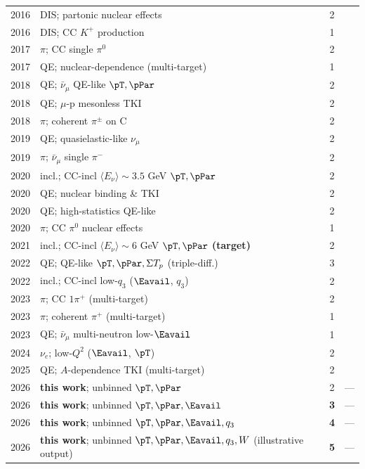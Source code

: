 {\begin{longtable}{@{}clcl@{}}
  2016 & DIS; partonic nuclear effects            & 2 & \cite{MINERvA:2016dis} \\
  2016 & DIS; CC $K^+$ production                  & 1 & \cite{MINERvA:2016kaon} \\
  2017 & $\pi$; CC single $\pi^0$                  & 2 & \cite{MINERvA:2017pi0} \\
  2017 & QE; nuclear-dependence (multi-target)     & 1 & \cite{MINERvA:2017Adep} \\
  2018 & QE; $\bar\nu_\mu$ QE-like $\pT,\pPar$     & 2 & \cite{MINERvA:2018hba} \\
  2018 & QE; $\mu$-p mesonless TKI                 & 2 & \cite{MINERvA:2018tcb} \\
  2018 & $\pi$; coherent $\pi^\pm$ on C            & 2 & \cite{MINERvA:2018coh} \\
  2019 & QE; quasielastic-like $\nu_\mu$           & 2 & \cite{MINERvA:2019qe} \\
  2019 & $\pi$; $\bar\nu_\mu$ single $\pi^-$       & 2 & \cite{MINERvA:2019pim} \\
  2020 & incl.; CC-incl $\langle E_\nu\rangle\!\sim\!3.5$ GeV $\pT,\pPar$ & 2 & \cite{MINERvA:2020jwd} \\
  2020 & QE; nuclear binding \& TKI               & 2 & \cite{MINERvA:2020cgh} \\
  2020 & QE; high-statistics QE-like              & 2 & \cite{MINERvA:2020qehs} \\
  2020 & $\pi$; CC $\pi^0$ nuclear effects        & 1 & \cite{MINERvA:2020pi0} \\
  2021 & incl.; CC-incl $\langle E_\nu\rangle\!\sim\!6$ GeV $\pT,\pPar$ \textbf{(target)} & 2 & \cite{MINERvA:2021owq} \\
  2022 & QE; QE-like $\pT,\pPar,\Sigma T_p$ (triple-diff.) & 3 & \cite{MINERvA:2022qelike3d} \\
  2022 & incl.; CC-incl low-$q_{3}$ ($\Eavail$, $q_{3}$) & 2 & \cite{MINERvA:2022incl} \\
  2023 & $\pi$; CC $1\pi^+$ (multi-target)        & 2 & \cite{MINERvA:2023ccpi} \\
  2023 & $\pi$; coherent $\pi^+$ (multi-target)   & 1 & \cite{MINERvA:2023coh} \\
  2023 & QE; $\bar\nu_\mu$ multi-neutron low-$\Eavail$ & 1 & \cite{MINERvA:2023lowEavail} \\
  2024 & $\nu_e$; low-$Q^2$ ($\Eavail$, $\pT$)    & 2 & \cite{MINERvA:2023avz} \\
  2025 & QE; $A$-dependence TKI (multi-target)    & 2 & \cite{MINERvA:2025tki} \\
  \midrule
  2026 & \textbf{this work}; unbinned $\pT,\pPar$            & 2 & --- \\
  2026 & \textbf{this work}; unbinned $\pT,\pPar,\Eavail$    & \textbf{3} & --- \\
  2026 & \textbf{this work}; unbinned $\pT,\pPar,\Eavail,q_{3}$ & \textbf{4} & --- \\
  2026 & \textbf{this work}; unbinned $\pT,\pPar,\Eavail,q_{3},W$ (illustrative output) & \textbf{5} & --- \\
\end{longtable}
}

